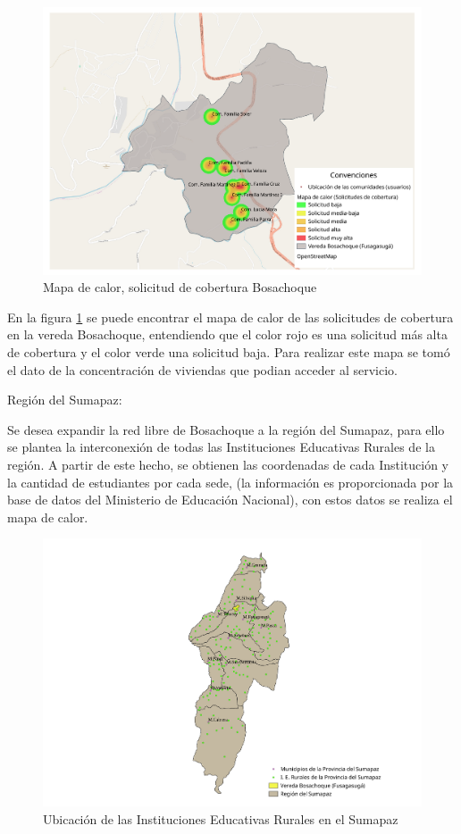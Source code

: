 \documentclass[]{article}
\begin{document}
\begin{figure}
\centering
\includegraphics[width=1.00000\textwidth]{mc_b_solicitudes.pdf}
\caption{Mapa de calor, solicitud de cobertura Bosachoque
\label{mylabel}}
\end{figure}

En la figura \ref{mylabel} se puede encontrar el mapa de calor de las
solicitudes de cobertura en la vereda Bosachoque, entendiendo que el
color rojo es una solicitud más alta de cobertura y el color verde una
solicitud baja. Para realizar este mapa se tomó el dato de la
concentración de viviendas que podian acceder al servicio.

Región del Sumapaz:

Se desea expandir la red libre de Bosachoque a la región del Sumapaz,
para ello se plantea la interconexión de todas las Instituciones
Educativas Rurales de la región. A partir de este hecho, se obtienen las
coordenadas de cada Institución y la cantidad de estudiantes por cada
sede, (la información es proporcionada por la base de datos del
Ministerio de Educación Nacional), con estos datos se realiza el mapa de
calor.

\begin{figure}
\centering
\includegraphics{Ubicacion_IE_Rurales.pdf}
\caption{Ubicación de las Instituciones Educativas Rurales en el
Sumapaz}
\end{figure}
\end{document}
